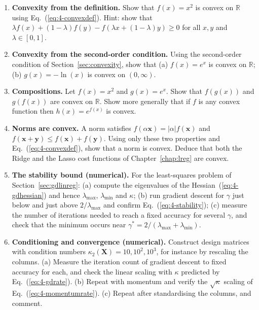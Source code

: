 \begin{enumerate}

\item \textbf{Convexity from the definition.}
  Show that $f(x)=x^{2}$ is convex on $\mathbb{R}$ using
  Eq.~(\ref{eq:4-convexdef}).  Hint: show that
  $\lambda f(x)+(1-\lambda)f(y)-f(\lambda x+(1-\lambda)y)\ge0$ for all
  $x,y$ and $\lambda\in[0,1]$.

\item \textbf{Convexity from the second-order condition.}
  Using the second-order condition of Section~\ref{sec:convexity}, show that
  (a) $f(x)=e^{x}$ is convex on $\mathbb{R}$;
  (b) $g(x)=-\ln(x)$ is convex on $(0,\infty)$.

\item \textbf{Compositions.}
  Let $f(x)=x^{2}$ and $g(x)=e^{x}$.  Show that $f(g(x))$ and $g(f(x))$ are
  convex on $\mathbb{R}$.  Show more generally that if $f$ is any convex
  function then $h(x)=e^{f(x)}$ is convex.

\item \textbf{Norms are convex.}
  A norm satisfies $f(\alpha\bm{x})=|\alpha|f(\bm{x})$ and
  $f(\bm{x}+\bm{y})\le f(\bm{x})+f(\bm{y})$.  Using only these two properties
  and Eq.~(\ref{eq:4-convexdef}), show that a norm is convex.  Deduce that
  both the Ridge and the Lasso cost functions of Chapter~\ref{chap:lreg} are
  convex.

\item \textbf{The stability bound (numerical).}
  For the least-squares problem of Section~\ref{sec:gdlinreg}:
  (a) compute the eigenvalues of the Hessian~(\ref{eq:4-gdhessian}) and hence
      $\lambda_{\max}$, $\lambda_{\min}$ and $\kappa$;
  (b) run gradient descent for $\gamma$ just below and just above
      $2/\lambda_{\max}$ and confirm Eq.~(\ref{eq:4-stability});
  (c) measure the number of iterations needed to reach a fixed accuracy for
      several $\gamma$, and check that the minimum occurs near
      $\gamma^{*}=2/(\lambda_{\max}+\lambda_{\min})$.

\item \textbf{Conditioning and convergence (numerical).}
  Construct design matrices with condition numbers
  $\kappa_2(\bm{X})=10,10^{2},10^{3}$, for instance by rescaling the columns.
  (a) Measure the iteration count of gradient descent to fixed accuracy for
      each, and check the linear scaling with $\kappa$ predicted by
      Eq.~(\ref{eq:4-gdrate}).
  (b) Repeat with momentum and verify the $\sqrt{\kappa}$ scaling of
      Eq.~(\ref{eq:4-momentumrate}).
  (c) Repeat after standardising the columns, and comment.


\end{enumerate}
